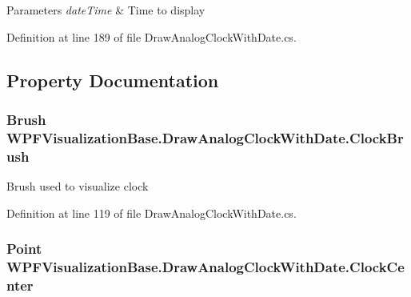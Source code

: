 \begin{DoxyParams}{Parameters}
{\em date\+Time} & Time to display\\
\hline
\end{DoxyParams}


Definition at line 189 of file Draw\+Analog\+Clock\+With\+Date.\+cs.



\subsection{Property Documentation}
\subsubsection[{\texorpdfstring{Clock\+Brush}{ClockBrush}}]{\setlength{\rightskip}{0pt plus 5cm}Brush W\+P\+F\+Visualization\+Base.\+Draw\+Analog\+Clock\+With\+Date.\+Clock\+Brush\hspace{0.3cm}{\ttfamily [get]}}\hypertarget{class_w_p_f_visualization_base_1_1_draw_analog_clock_with_date_aaa2561134d996d38fa087f18410eaff0}{}\label{class_w_p_f_visualization_base_1_1_draw_analog_clock_with_date_aaa2561134d996d38fa087f18410eaff0}


Brush used to visualize clock 



Definition at line 119 of file Draw\+Analog\+Clock\+With\+Date.\+cs.

\subsubsection[{\texorpdfstring{Clock\+Center}{ClockCenter}}]{\setlength{\rightskip}{0pt plus 5cm}Point W\+P\+F\+Visualization\+Base.\+Draw\+Analog\+Clock\+With\+Date.\+Clock\+Center\hspace{0.3cm}{\ttfamily [get]}}\hypertarget{class_w_p_f_visualization_base_1_1_draw_analog_clock_with_date_abfcb9a2da12ae274e84221ab7eab52de}{}\label{class_w_p_f_visualization_base_1_1_draw_analog_clock_with_date_abfcb9a2da12ae274e84221ab7eab52de}


